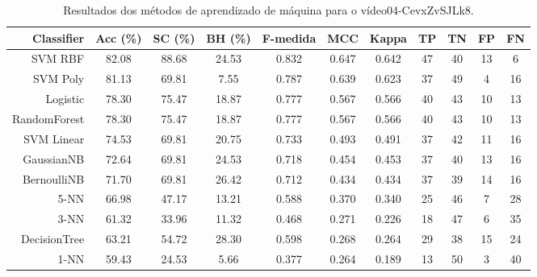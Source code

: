 \begin{table}[!htb]
\centering
\caption{Resultados dos métodos de aprendizado de máquina para o vídeo04-CevxZvSJLk8.}
\label{tab:04-CevxZvSJLk8}
\begin{tabular}{r|c|c|c|c|c|c|c|c|c|c}
\hline\hline
Classifier & Acc (\%) & SC (\%) & BH (\%) & F-medida & MCC & Kappa & TP & TN & FP & FN \\ \hline
SVM RBF & 82.08 & 88.68 & 24.53 & 0.832 & 0.647 & 0.642 & 47 & 40 & 13 & 6 \\ 
SVM Poly & 81.13 & 69.81 & 7.55 & 0.787 & 0.639 & 0.623 & 37 & 49 & 4 & 16 \\ 
Logistic & 78.30 & 75.47 & 18.87 & 0.777 & 0.567 & 0.566 & 40 & 43 & 10 & 13 \\ 
RandomForest & 78.30 & 75.47 & 18.87 & 0.777 & 0.567 & 0.566 & 40 & 43 & 10 & 13 \\ 
SVM Linear & 74.53 & 69.81 & 20.75 & 0.733 & 0.493 & 0.491 & 37 & 42 & 11 & 16 \\ 
GaussianNB & 72.64 & 69.81 & 24.53 & 0.718 & 0.454 & 0.453 & 37 & 40 & 13 & 16 \\ 
BernoulliNB & 71.70 & 69.81 & 26.42 & 0.712 & 0.434 & 0.434 & 37 & 39 & 14 & 16 \\ 
5-NN & 66.98 & 47.17 & 13.21 & 0.588 & 0.370 & 0.340 & 25 & 46 & 7 & 28 \\ 
3-NN & 61.32 & 33.96 & 11.32 & 0.468 & 0.271 & 0.226 & 18 & 47 & 6 & 35 \\ 
DecisionTree & 63.21 & 54.72 & 28.30 & 0.598 & 0.268 & 0.264 & 29 & 38 & 15 & 24 \\ 
1-NN & 59.43 & 24.53 & 5.66 & 0.377 & 0.264 & 0.189 & 13 & 50 & 3 & 40 \\ 
\hline\hline
\end{tabular}
\end{table}
